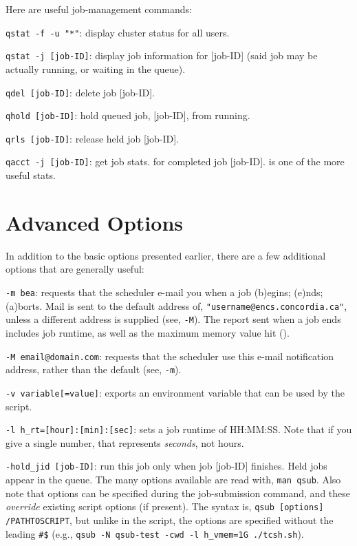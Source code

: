 \documentclass{easychair}
\begin{document}
Here are useful job-management commands: 

\texttt{qstat -f -u "*"}: display cluster status for all users. 

\texttt{qstat -j [job-ID]}: display job information for [job-ID] (said job may be actually running, or  waiting in the queue). 

\texttt{qdel [job-ID]}: delete job [job-ID]. 

\texttt{qhold [job-ID]}: hold queued job, [job-ID], from running. 

\texttt{qrls [job-ID]}: release held job [job-ID]. 

\texttt{qacct -j [job-ID]}: get job stats. for completed job [job-ID].  is one of the more  useful stats. 

\section{Advanced  Options}

In addition to the basic  options presented earlier, there are a few additional options that are generally useful:  

\texttt{-m bea}: requests that the scheduler e-mail you when a job (b)egins; (e)nds; (a)borts.  Mail is sent to the default address of, \texttt{"username@encs.concordia.ca"}, unless a  different address is supplied (see, \texttt{-M}). The report sent when a job ends includes job 
runtime, as well as the maximum memory value hit (). 

\texttt{-M email@domain.com}: requests that the scheduler use this e-mail notification address, rather than the default (see, \texttt{-m}). 

\texttt{-v variable[=value]}: exports an environment variable that can be used by the script.

\texttt{-l h\_rt=[hour]:[min]:[sec]}: sets a job runtime of HH:MM:SS. Note that if you give a single number, that represents \emph{seconds}, not hours. 

\texttt{-hold\_jid [job-ID]}: run this job only when job [job-ID] finishes. Held jobs appear in the  queue. 
The many  options available are read with, \texttt{man qsub}. Also note that  options can be specified during the job-submission command, and these \emph{override}  existing script options (if present). The syntax is, \texttt{qsub [options] /PATHTOSCRIPT}, but  unlike in the script, the options are specified without the leading \verb+#$+ (e.g., \texttt{qsub -N  qsub-test -cwd -l h\_vmem=1G ./tcsh.sh}). 
\end{document}
